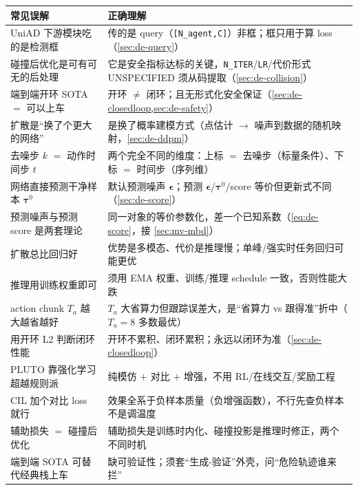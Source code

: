 \begin{table}[H]\centering\small
\begin{tabular}{p{} p{}}
\toprule
\textbf{常见误解} & \textbf{正确理解} \\
\midrule
UniAD 下游模块吃的是检测框 & 传的是 query（\texttt{[N\_agent,C]}）非框；框只用于算 loss（\cref{sec:de-query}）\\
碰撞后优化是可有可无的后处理 & 它是安全指标达标的关键，\texttt{N\_ITER}/\texttt{LR}/代价形式 UNSPECIFIED 须从码提取（\cref{sec:de-collision}）\\
端到端开环 SOTA $=$ 可以上车 & 开环 $\neq$ 闭环；且无形式化安全保证（\cref{sec:de-closedloop,sec:de-safety}）\\
扩散是“换了个更大的网络” & 是换了概率建模方式（点估计 $\to$ 噪声到数据的随机映射，\cref{sec:de-ddpm}）\\
去噪步 $k$ $=$ 动作时间步 $t$ & 两个完全不同的维度：上标 $=$ 去噪步（标量条件）、下标 $=$ 时间步（序列维）\\
网络直接预测干净样本 $\boldsymbol{\tau}^0$ & 默认预测噪声 $\boldsymbol{\epsilon}$；预测 $\boldsymbol{\epsilon}$/$\boldsymbol{\tau}^0$/score 等价但更新式不同（\cref{sec:de-score}）\\
预测噪声与预测 score 是两套理论 & 同一对象的等价参数化，差一个已知系数（\cref{eq:de-score}，接 \cref{sec:mv-mbd}）\\
扩散总比回归好 & 优势是多模态、代价是推理慢；单峰/强实时任务回归可能更优 \\
推理用训练权重即可 & 须用 EMA 权重、训练/推理 schedule 一致，否则性能大跌 \\
action chunk $T_a$ 越大越省越好 & $T_a$ 大省算力但跟踪误差大，是“省算力 vs 跟得准”折中（$T_a=8$ 多数最优）\\
用开环 L2 判断闭环性能 & 开环不累积、闭环累积；永远以闭环为准（\cref{sec:de-closedloop}）\\
PLUTO 靠强化学习超越规则派 & 纯模仿 $+$ 对比 $+$ 增强，不用 RL/在线交互/奖励工程 \\
CIL 加个对比 loss 就行 & 效果全系于负样本质量（负增强函数），不行先查负样本不是调温度 \\
辅助损失 $=$ 碰撞后优化 & 辅助损失是训练时内化、碰撞投影是推理时修正，两个不同时机 \\
端到端 SOTA 可替代经典栈上车 & 缺可验证性；须套“生成-验证”外壳，问“危险轨迹谁来拦”\\
\bottomrule
\end{tabular}
\end{table}

